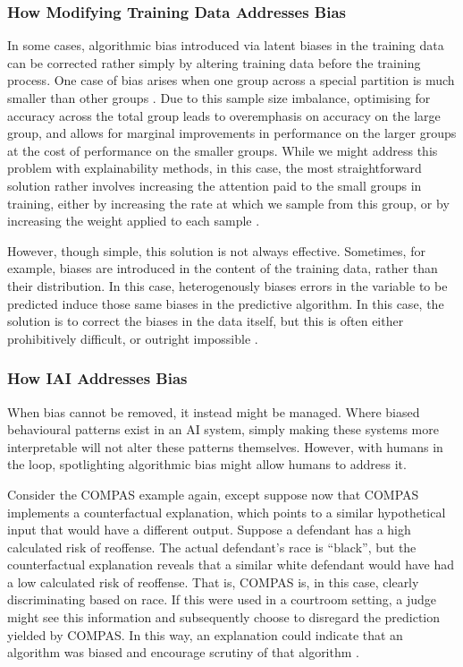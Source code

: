 \subsubsection{How Modifying Training Data Addresses Bias}
In some cases, algorithmic bias introduced via latent biases in the training data can be corrected rather simply by altering training data before the training process. One case of bias arises when one group across a special partition is much smaller than other groups \cite{barocas_big_2016}. Due to this sample size imbalance, optimising for accuracy across the total group leads to overemphasis on accuracy on the large group, and allows for marginal improvements in performance on the larger groups at the cost of performance on the smaller groups. While we might address this problem with explainability methods, in this case, the most straightforward solution rather involves increasing the attention paid to the small groups in training, either by increasing the rate at which we sample from this group, or by increasing the weight applied to each sample \cite{barocas_big_2016}. 

However, though simple, this solution is not always effective. Sometimes, for example, biases are introduced in the content of the training data, rather than their distribution. In this case, heterogenously biases errors in the variable to be predicted induce those same biases in the predictive algorithm. In this case, the solution is to correct the biases in the data itself, but this is often either prohibitively difficult, or outright impossible \cite{barocas_big_2016}. 

\subsubsection{How IAI Addresses Bias}
When bias cannot be removed, it instead might be managed. Where biased behavioural patterns exist in an AI system, simply making these systems more interpretable will not alter these patterns themselves. However, with humans in the loop, spotlighting algorithmic bias might allow humans to address it.

Consider the COMPAS example again, except suppose now that COMPAS implements a counterfactual explanation, which points to a similar hypothetical input that would have a different output. Suppose a defendant has a high calculated risk of reoffense. The actual defendant's race is “black”, but the counterfactual explanation reveals that a similar white defendant would have had a low calculated risk of reoffense. That is, COMPAS is, in this case, clearly discriminating based on race. If this were used in a courtroom setting, a judge might see this information and subsequently choose to disregard the prediction yielded by COMPAS. In this way, an explanation could indicate that an algorithm was biased and encourage scrutiny of that algorithm \cite{mothilal_explaining_2019,wachter_counterfactual_2017}.

